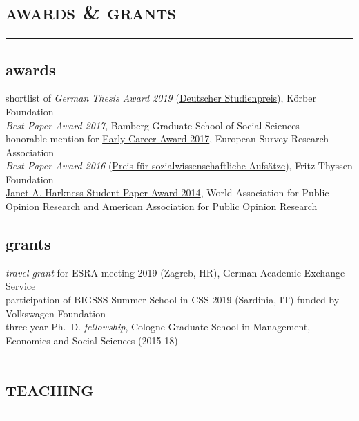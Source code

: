 \documentclass[11pt, a4paper]{article}
\begin{document}
\section*{\textsc{awards \& grants}}
\vskip-20pt{\noindent\rule{\textwidth}{1pt}}
\subsection*{awards}
shortlist of \textit{German Thesis Award 2019} (\href{https://www.koerber-stiftung.de/fileadmin/user_upload/koerber-stiftung/redaktion/deutscher-studienpreis/pdf/2019/2019_Nominierte_SozialWissenschaften.pdf}{Deutscher Studienpreis}), Körber Foundation\\
\textit{Best Paper Award 2017}, Bamberg Graduate School of Social Sciences\\
honorable mention for \href{https://wapor.org/events/annual-conference/awards-funds/janet-a-harkness-student-paper-award/}{Early Career Award 2017}, European Survey Research Association\\
\textit{Best Paper Award 2016} (\href{https://www.iss-wiso.uni-koeln.de/sites/soziologie/PDF/Kooperationen/liste-vergangener-preistraeger-thyssen-preis.pdf}{Preis für sozialwissenschaftliche Aufsätze}), Fritz Thyssen Foundation\\
\href{https://wapor.org/events/annual-conference/awards-funds/janet-a-harkness-student-paper-award/}{Janet A. Harkness Student Paper Award 2014}, World Association for Public Opinion Research and American Association for Public Opinion Research\\
\subsection*{grants}
\textit{travel grant} for ESRA meeting 2019 (Zagreb, HR), German Academic Exchange Service\\
participation of BIGSSS Summer School in CSS 2019 (Sardinia, IT) funded by Volkswagen Foundation\\
three-year Ph.~D. \textit{fellowship}, Cologne Graduate School in Management, Economics and Social Sciences (2015-18)
\section*{\textsc{teaching}}
\vskip-20pt{\noindent\rule{\textwidth}{1pt}}
\noindent
\end{document}
